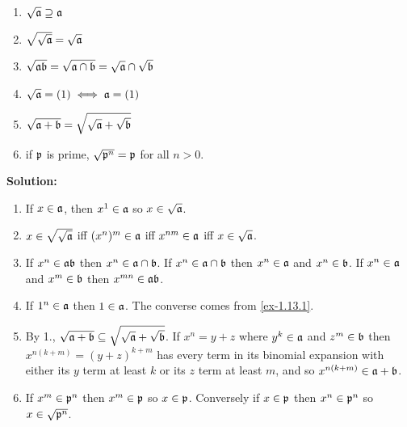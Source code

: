 \documentclass{article}
\begin{document}
\begin{exercise}
    \begin{enumerate}
        \item \label{ex-1.13.1} \(\sqrt{\mathfrak{a}} \supseteq \mathfrak{a}\)
        \item \(\sqrt{\sqrt{\mathfrak{a}}} = \sqrt{\mathfrak{a}}\)
        \item \(\sqrt{\mathfrak{ab}} = \sqrt{\mathfrak{a} \cap \mathfrak{b}} = \sqrt{\mathfrak{a}} \cap \sqrt{\mathfrak{b}}\)
        \item \(\sqrt{\mathfrak{a}} = (1) \iff \mathfrak{a} = (1)\)
        \item \(\sqrt{\mathfrak{a} + \mathfrak{b}} = \sqrt{\sqrt{\mathfrak{a}} + \sqrt{\mathfrak{b}}}\)
        \item if \(\mathfrak{p}\) is prime, \(\sqrt{\mathfrak{p}^n} = \mathfrak{p}\) for all \(n > 0\).
    \end{enumerate}
\end{exercise}

\noindent\textbf{Solution:}
\begin{enumerate}
    \item
        If \(x \in \mathfrak{a}\), then \(x^1 \in \mathfrak{a}\) so \(x \in \sqrt{\mathfrak{a}}\).
    \item
        \(x \in \sqrt{\sqrt{\mathfrak{a}}}\) iff \((x^n)^m \in \mathfrak{a}\) iff \(x^{nm} \in \mathfrak{a}\) iff \(x \in \sqrt{\mathfrak{a}}\).
    \item
        If \(x^n \in \mathfrak{a} \mathfrak{b}\) then \(x^n \in \mathfrak{a} \cap \mathfrak{b}\).
        If \(x^n \in \mathfrak{a} \cap \mathfrak{b}\) then \(x^n \in \mathfrak{a}\) and \(x^n \in \mathfrak{b}\).
        If \(x^n \in \mathfrak{a}\) and \(x^m \in \mathfrak{b}\) then \(x^{mn} \in \mathfrak{a} \mathfrak{b}\).
    \item
        If \(1^n \in \mathfrak{a}\) then \(1 \in \mathfrak{a}\).
        The converse comes from \ref{ex-1.13.1}.
    \item
        By 1., \(\sqrt{\mathfrak{a} + \mathfrak{b}} \subseteq \sqrt{\sqrt{\mathfrak{a}} + \sqrt{\mathfrak{b}}}\).
        If \(x^n = y + z\) where \(y^k \in \mathfrak{a}\) and \(z^m \in \mathfrak{b}\) then \(x^{n (k + m)} = (y + z)^{k + m}\) has every term in its binomial expansion with either its \(y\) term at least \(k\) or its \(z\) term at least \(m\), and so \(x^{n (k+m)} \in \mathfrak{a} + \mathfrak{b}\).
    \item
        If \(x^m \in \mathfrak{p}^n\) then \(x^m \in \mathfrak{p}\) so \(x \in \mathfrak{p}\).
        Conversely if \(x \in \mathfrak{p}\) then \(x^n \in \mathfrak{p}^n\) so \(x \in \sqrt{\mathfrak{p}^n}\).
\end{enumerate}

\setcounter{exercise}{17}
\end{document}
